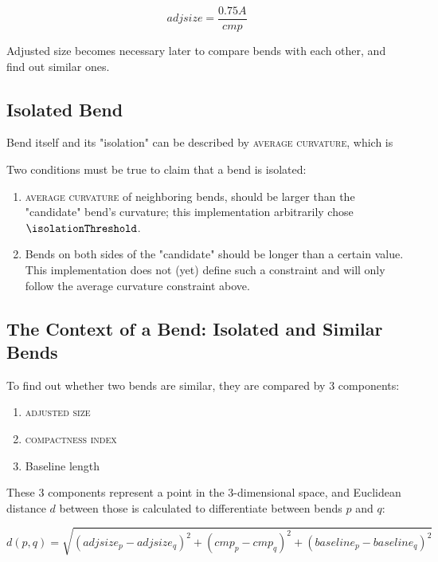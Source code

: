 \documentclass[a4paper]{article}
\begin{document}
\[
    adjsize = \frac{0.75 A}{cmp}
\]

Adjusted size becomes necessary later to compare bends with each other, and
find out similar ones.

\subsection{Isolated Bend}

Bend itself and its "isolation" can be described by \textsc{average curvature},
which is 

Two conditions must be true to claim that a bend is isolated:

\begin{enumerate}
    \item \textsc{average curvature} of neighboring bends, should be larger
        than the "candidate" bend's curvature; this implementation arbitrarily
        chose $\isolationThreshold$.

    \item Bends on both sides of the "candidate" should be longer than a
        certain value. This implementation does not (yet) define such a
        constraint and will only follow the average curvature constraint above.
\end{enumerate}

\subsection{The Context of a Bend: Isolated and Similar Bends}

To find out whether two bends are similar, they are compared by 3 components:

\begin{enumerate}
    \item \textsc{adjusted size}
    \item \textsc{compactness index}
    \item Baseline length
\end{enumerate}

These 3 components represent a point in the 3-dimensional space, and Euclidean
distance $d$ between those is calculated to differentiate between bends $p$ and
$q$:

\[
    d(p,q) = \sqrt{(adjsize_p-adjsize_q)^2 +
                   (cmp_p-cmp_q)^2 +
                   (baseline_p-baseline_q)^2}
\]
\end{document}
